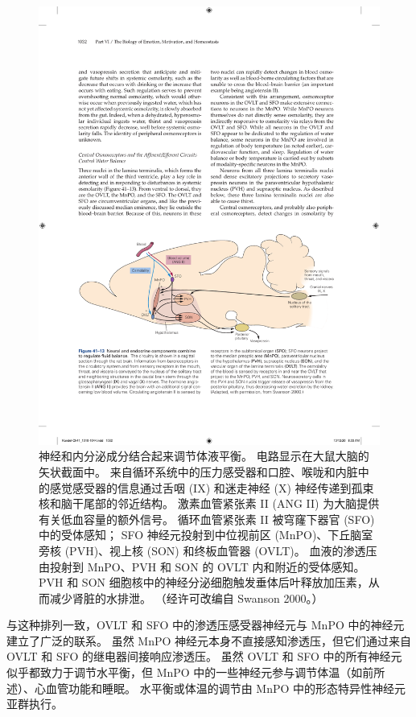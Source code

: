\begin{figure}[htbp]
	\centering
	\includegraphics[width=0.95\linewidth]{chap41/fig_41_13}
	\caption{神经和内分泌成分结合起来调节体液平衡。 电路显示在大鼠大脑的矢状截面中。 来自循环系统中的压力感受器和口腔、喉咙和内脏中的感觉感受器的信息通过舌咽 (IX) 和迷走神经 (X) 神经传递到孤束核和脑干尾部的邻近结构。 激素血管紧张素 II (ANG II) 为大脑提供有关低血容量的额外信号。 循环血管紧张素 II 被穹窿下器官 (SFO) 中的受体感知； SFO 神经元投射到中位视前区 (MnPO)、下丘脑室旁核 (PVH)、视上核 (SON) 和终板血管器 (OVLT)。 血液的渗透压由投射到 MnPO、PVH 和 SON 的 OVLT 内和附近的受体感知。 PVH 和 SON 细胞核中的神经分泌细胞触发垂体后叶释放加压素，从而减少肾脏的水排泄。 （经许可改编自 Swanson 2000。）}
	\label{fig:41_13}
\end{figure}

与这种排列一致，OVLT 和 SFO 中的渗透压感受器神经元与 MnPO 中的神经元建立了广泛的联系。 虽然 MnPO 神经元本身不直接感知渗透压，但它们通过来自 OVLT 和 SFO 的继电器间接响应渗透压。 虽然 OVLT 和 SFO 中的所有神经元似乎都致力于调节水平衡，但 MnPO 中的一些神经元参与调节体温（如前所述）、心血管功能和睡眠。 水平衡或体温的调节由 MnPO 中的形态特异性神经元亚群执行。

